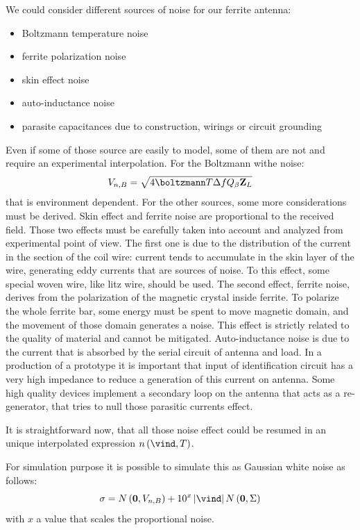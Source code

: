 We could consider different sources of noise for our ferrite antenna:
\begin{itemize}
\item Boltzmann temperature noise
\item ferrite polarization noise
\item skin effect noise
\item auto-inductance noise
\item parasite capacitances due to construction, wirings or circuit grounding
\end{itemize}

Even if some of those source are easily to model, some of them are not and require an experimental interpolation. For the Boltzmann withe noise:
\[
V_{n,B} = \sqrt{4 \boltzmann T \Delta f Q_{\beta} \mathbf{Z}_{L}}
\]
that is environment dependent. For the other sources, some more considerations must be derived. Skin effect and ferrite noise are proportional to the received field. 
Those two effects must be carefully taken into account and analyzed from experimental point of view. The first one is due to the distribution of the current in the section of the coil wire: current tends to accumulate in the skin layer of the wire, generating eddy currents that are sources of noise. To this effect, some special woven wire, like litz wire, should be used.
The second effect, ferrite noise, derives from the polarization of the magnetic crystal inside ferrite. To polarize the whole ferrite bar, some energy must be spent to move magnetic domain, and the movement of those domain generates a noise. This effect is strictly related to the quality of material and cannot be mitigated.
Auto-inductance noise is due to the current that is absorbed by the serial circuit of antenna and load. In a production of a prototype it is important that input of identification circuit has a very high impedance to reduce a generation of this current on antenna. Some high quality devices implement a secondary loop on the antenna that acts as a re-generator, that tries to null those parasitic currents effect.

It is straightforward now, that all those noise effect could be resumed in an unique interpolated expression ${n \braces{\vind,T}}$.

For simulation purpose it is possible to simulate this as Gaussian white noise as follows:
\begin{equation}
\sigma = N\braces{\mathbf{0}, V_{n,B}} + 10^{x} \abs{\vind} N\braces{\mathbf{0}, \Sigma}
\end{equation}
with $x$ a value that scales the proportional noise.